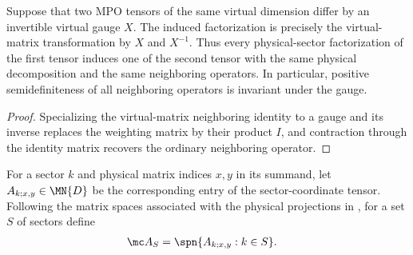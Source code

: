 \begin{lemma}
    \label{thm:mpdo_physical_sector_factorization_gauge}
    \leanok
    Suppose that two MPO tensors of the same virtual dimension differ by an
    invertible virtual gauge $X$.  The induced factorization is precisely the
    virtual-matrix transformation by $X$ and $X^{-1}$.  Thus every physical-sector
    factorization of the first tensor induces one of the second tensor with
    the same physical decomposition and the same neighboring operators.  In
    particular, positive semidefiniteness of all neighboring operators is
    invariant under the gauge.
\end{lemma}

\begin{proof}
    \leanok
    Specializing the virtual-matrix neighboring identity to a gauge and its
    inverse replaces the weighting matrix by their product $I$, and
    contraction through the identity matrix recovers the ordinary neighboring
    operator.
\end{proof}

\begin{definition}%
    \label{def:mpdo_one_site_sector_matrix_space}
    \leanok
    For a sector $k$ and physical matrix indices $x,y$ in its summand, let
    $A_{k;x,y}\in\MN{D}$ be the corresponding entry of the
    sector-coordinate tensor. Following the matrix spaces associated with the
    physical projections in
    \cite[Appendix~C.2, lines~1463--1467]{Cirac2016MPDO_arXiv}, for a set $S$
    of sectors define
    \begin{align}
        \mc A_S
         & =\spn\{A_{k;x,y}:k\in S\}.
        \notag
    \end{align}
\end{definition}

